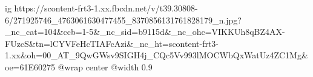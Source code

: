  
 
 
 
 

\ifcmt
  ig https://scontent-frt3-1.xx.fbcdn.net/v/t39.30808-6/271925746_4763061630477455_8370856131761828179_n.jpg?_nc_cat=104&ccb=1-5&_nc_sid=b9115d&_nc_ohc=VIKKUh8qBZ4AX-FUzcS&tn=lCYVFeHcTIAFcAzi&_nc_ht=scontent-frt3-1.xx&oh=00_AT_9QwGWsv9SIGH4j_CQc5Vv993lMOCWbQxWatUz4ZC1Mg&oe=61E60275
	@wrap center
	@width 0.9
\fi
